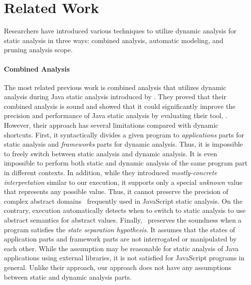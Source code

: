 \section{Related Work}\label{sec:related}
Researchers have introduced various techniques to utilize dynamic
analysis for static analysis in three ways: combined analysis,
automatic modeling, and pruning analysis scope.


\paragraph{Combined Analysis}
The most related previous work is combined analysis that utilizes dynamic
analysis during Java static analysis introduced by \citet{concerto}.
They proved that their combined analysis is sound and showed that it could
significantly improve the precision and performance of Java static analysis by
evaluating their tool, \concerto.  However, their approach has several
limitations compared with dynamic shortcuts.  First, it syntactically
divides a given program to \textit{applications} parts for static
analysis and \textit{frameworks} parts for dynamic analysis.  Thus, it is impossible to
freely switch between static analysis and dynamic analysis.  It is
even impossible to perform both static and dynamic analysis of 
the same program part in different contexts.  In addition, while they
introduced \textit{mostly-concrete interpretation} similar to our
{\sealed} execution, it supports only a special \textit{unknown}
value that represents any possible value.  Thus, it cannot preserve
the precision of complex abstract domains~\cite{revisit-recency,
  regex, weaklySPE} frequently used in JavaScript static analysis.
On the contrary, {\sealed} execution automatically detects when
to switch to static analysis to use abstract semantics for abstract values.
Finally, \concerto\ preserves the soundness when a program satisfies
the \textit{state separation hypothesis}.  It assumes that the states
of application parts and framework parts are not interrogated
or manipulated by each other.  While the assumption may be reasonable
for static analysis of Java applications using external libraries, it
is not satisfied for JavaScript programs in general.  Unlike their
approach, our approach does not have any assumptions between static and
dynamic analysis parts.


